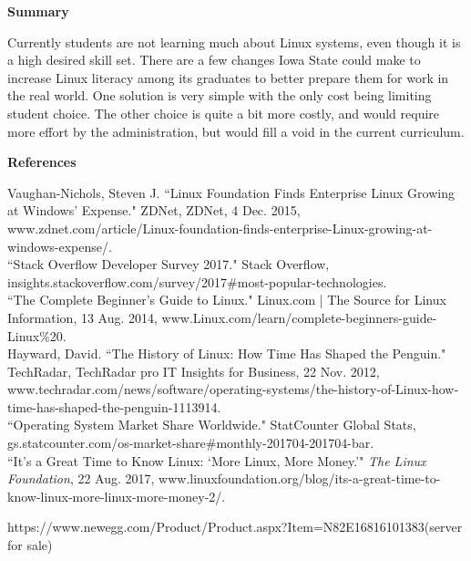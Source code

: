 \documentclass[11pt]{article}
\begin{document}
  \noindent\large{\textbf{Summary}}

  \noindent Currently students are not learning much about Linux systems, even though it is a high desired skill set. There are a few changes Iowa State could
  make to increase Linux literacy among its graduates to better prepare them for work in the real world. One solution is very simple with the only cost being
  limiting student choice. The other choice is quite a bit more costly, and would require more effort by the administration, but would fill a void in the current
  curriculum.

  \clearpage

  \begin{center} \large{\textbf{References}} \end{center}

  \noindent Vaughan-Nichols, Steven J. ``Linux Foundation Finds Enterprise Linux Growing at Windows'
  Expense." ZDNet, ZDNet, 4 Dec. 2015,
  www.zdnet.com/article/Linux-foundation-finds-enterprise-Linux-growing-at-windows-expense/.\\

  \noindent ``Stack Overflow Developer Survey 2017." Stack Overflow,\\ insights.stackoverflow.com/survey/2017\#most-popular-technologies.\\

  \noindent ``The Complete Beginner's Guide to Linux." Linux.com | The Source for Linux Information, 13 Aug. 2014, www.Linux.com/learn/complete-beginners-guide-Linux\%20.\\

  \noindent Hayward, David. ``The History of Linux: How Time Has Shaped the Penguin." TechRadar, TechRadar pro IT Insights for Business, 22 Nov. 2012,\\ www.techradar.com/news/software/operating-systems/the-history-of-Linux-how-time-has-shaped-the-penguin-1113914.\\

  \noindent ``Operating System Market Share Worldwide." StatCounter Global Stats, gs.statcounter.com/os-market-share\#monthly-201704-201704-bar.\\

  \noindent ``It's a Great Time to Know Linux: `More Linux, More Money.'" \textit{The Linux Foundation}, 22 Aug. 2017,
  www.linuxfoundation.org/blog/its-a-great-time-to-know-linux-more-linux-more-money-2/.

  \noindent https://www.newegg.com/Product/Product.aspx?Item=N82E16816101383(server for sale)

  
\end{document}
